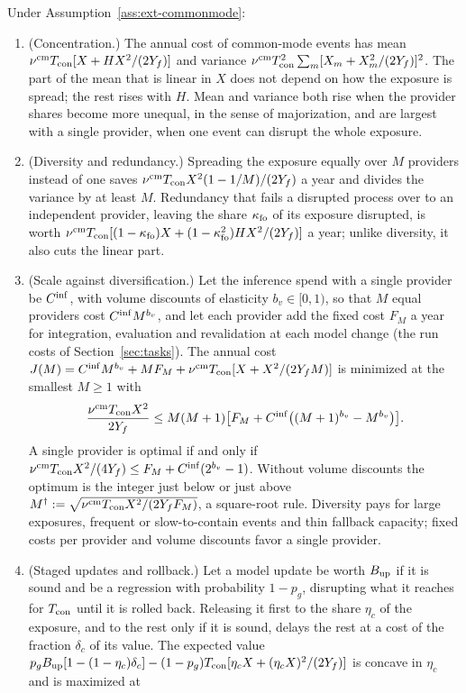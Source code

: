 \begin{proposition}\label{prop:ext-commonmode}
Under Assumption~\ref{ass:ext-commonmode}:
\begin{enumerate}
\item[(a)] (Concentration.) The annual cost of common-mode events has mean $\nu^{\rm cm}T_{\rm con}[X+HX^2/(2Y_f)]$ and variance $\nu^{\rm cm}T_{\rm con}^2\sum_m[X_m+X_m^2/(2Y_f)]^2$. The part of the mean that is linear in $X$ does not depend on how the exposure is spread; the rest rises with $H$. Mean and variance both rise when the provider shares become more unequal, in the sense of majorization, and are largest with a single provider, when one event can disrupt the whole exposure.
\item[(b)] (Diversity and redundancy.) Spreading the exposure equally over $M$ providers instead of one saves $\nu^{\rm cm}T_{\rm con}X^2(1-1/M)/(2Y_f)$ a year and divides the variance by at least $M$. Redundancy that fails a disrupted process over to an independent provider, leaving the share $\kappa_{\rm fo}$ of its exposure disrupted, is worth $\nu^{\rm cm}T_{\rm con}[(1-\kappa_{\rm fo})X+(1-\kappa_{\rm fo}^2)HX^2/(2Y_f)]$ a year; unlike diversity, it also cuts the linear part.
\item[(c)] (Scale against diversification.) Let the inference spend with a single provider be $C^{\rm inf}$, with volume discounts of elasticity $b_v\in[0,1)$, so that $M$ equal providers cost $C^{\rm inf}M^{b_v}$, and let each provider add the fixed cost $F_M$ a year for integration, evaluation and revalidation at each model change (the run costs of Section~\ref{sec:tasks}). The annual cost $J(M)=C^{\rm inf}M^{b_v}+MF_M+\nu^{\rm cm}T_{\rm con}[X+X^2/(2Y_fM)]$ is minimized at the smallest $M\ge1$ with
\begin{equation}\label{eq:ext-providers}
\frac{\nu^{\rm cm}T_{\rm con}X^2}{2Y_f}\le M(M+1)\bigl[F_M+C^{\rm inf}\bigl((M+1)^{b_v}-M^{b_v}\bigr)\bigr].
\end{equation}
A single provider is optimal if and only if $\nu^{\rm cm}T_{\rm con}X^2/(4Y_f)\le F_M+C^{\rm inf}(2^{b_v}-1)$. Without volume discounts the optimum is the integer just below or just above $M^\dagger:=\sqrt{\nu^{\rm cm}T_{\rm con}X^2/(2Y_fF_M)}$, a square-root rule. Diversity pays for large exposures, frequent or slow-to-contain events and thin fallback capacity; fixed costs per provider and volume discounts favor a single provider.
\item[(d)] (Staged updates and rollback.) Let a model update be worth $B_{\rm up}$ if it is sound and be a regression with probability $1-p_g$, disrupting what it reaches for $T_{\rm con}$ until it is rolled back. Releasing it first to the share $\eta_c$ of the exposure, and to the rest only if it is sound, delays the rest at a cost of the fraction $\delta_c$ of its value. The expected value $p_gB_{\rm up}[1-(1-\eta_c)\delta_c]-(1-p_g)T_{\rm con}[\eta_cX+(\eta_cX)^2/(2Y_f)]$ is concave in $\eta_c$ and is maximized at

\end{enumerate}
\end{proposition}

